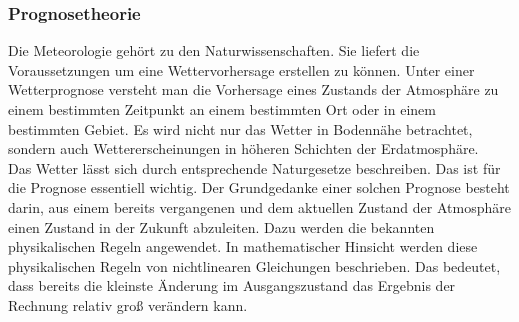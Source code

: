 \documentclass[a4paper,oneside,10pt,titlepage]{article}
\begin{document}
\subsubsection{Prognosetheorie}
Die Meteorologie gehört zu den Naturwissenschaften. Sie liefert die Voraussetzungen um eine Wettervorhersage erstellen zu können. Unter einer Wetterprognose versteht man die Vorhersage eines Zustands der Atmosphäre zu einem bestimmten Zeitpunkt an einem bestimmten Ort oder in einem bestimmten Gebiet. Es wird nicht nur das Wetter in Bodennähe betrachtet, sondern auch Wettererscheinungen in höheren Schichten der  Erdatmosphäre.
\\
Das Wetter lässt sich durch entsprechende Naturgesetze beschreiben. Das ist für die Prognose essentiell wichtig. Der Grundgedanke einer solchen Prognose besteht darin, aus einem bereits vergangenen und dem aktuellen Zustand der Atmosphäre einen Zustand in der Zukunft abzuleiten. Dazu werden die bekannten physikalischen Regeln angewendet. In mathematischer Hinsicht werden diese physikalischen Regeln von nichtlinearen Gleichungen beschrieben. Das bedeutet, dass bereits die kleinste Änderung im Ausgangszustand das Ergebnis der Rechnung relativ groß verändern kann.%
\end{document}
